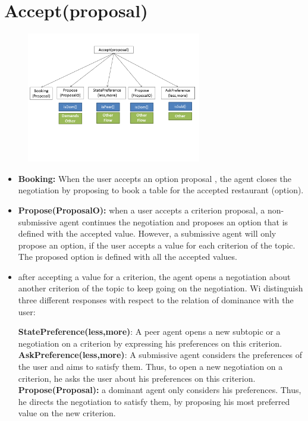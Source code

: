 \documentclass{llncs}
\begin{document}
\section{Accept(proposal)}
\begin{figure}[]
		\centerline{\includegraphics[width=3in]{figs/utterances_v2/Diapositive3.PNG}}
		\vskip 8pt
\end{figure}
\begin{itemize}
\item \textbf{Booking: } When the user accepts an option proposal , the agent closes the negotiation by proposing to book a table for the accepted restaurant (option).

\item \textbf{Propose(ProposalO):} when a user accepts a criterion proposal, a non-submissive agent continues the negotiation and proposes an option that is defined with the accepted value. However, a submissive agent will only propose an option, if the user accepts a value for each criterion of the topic.  The proposed option is defined with all the accepted values.
\item after accepting a value for a criterion, the agent opens a negotiation about another criterion of the topic to keep going on the negotiation. Wi distinguish three different responses with respect to the relation of dominance with the user:

	\subitem \textbf{StatePreference(less,more)}:  A peer agent opens a new subtopic or a negotiation on a criterion by expressing his preferences on this criterion.
	\subitem \textbf{AskPreference(less,more)}:  A submissive agent considers the preferences of the user and aims to satisfy them. Thus, to open a new negotiation on a criterion, he asks the user about his preferences on this criterion.
	\subitem \textbf{Propose(Proposal):} a dominant agent only considers his preferences. Thus, he directs the negotiation to satisfy them, by proposing his most preferred value on the new criterion. 
\end{itemize}
\end{document}
